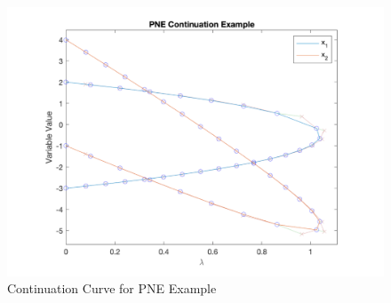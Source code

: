 \documentclass[12pt]{article}
\numberwithin{equation}{section}
\numberwithin{table}{section}
\numberwithin{figure}{section}
\begin{document}
\begin{figure}[!htp]
  \centering
  \includegraphics[width=\textwidth]{./figures/pne_ex1}
  \caption{Continuation Curve for PNE Example}
  \label{fig:pne_ex1}
\end{figure}
\end{document}
